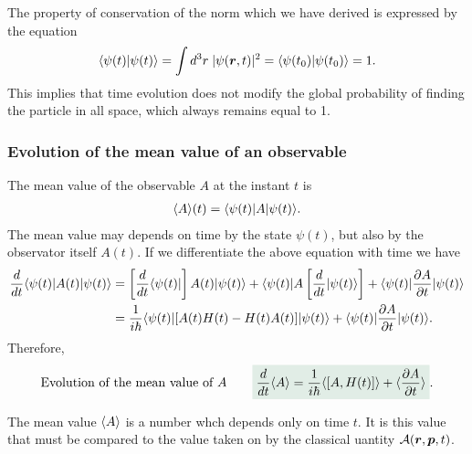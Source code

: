 The property of conservation of the norm which we have derived is expressed by the equation
\begin{align}
    \langle\psi(t)|\psi(t)\rangle=\int d^3r\;|\psi(\bm{r},t)|^2=\langle\psi(t_0)|\psi(t_0)\rangle=1.
\end{align}
This implies that time evolution does not modify the global probability of finding the particle in all space, which always remains equal to 1.

\subsubsection{Evolution of the mean value of an observable}
The mean value of the observable $A$ at the instant $t$ is 
\begin{align}
    \langle A\rangle(t)=\langle\psi(t)|A|\psi(t)\rangle.
\end{align}
The mean value may depends on time by the state $\psi(t)$, but also by the observator itself $A(t)$.
If we differentiate the above equation with time we have 
\begin{align*}
    \frac{d}{dt}\langle\psi(t)|A(t)|\psi(t)\rangle&=\left[\frac{d}{dt}\langle\psi(t)|\right]A(t)|\psi(t)\rangle+\langle\psi(t)|A\left[\frac{d}{dt}|\psi(t)\rangle\right]+
    \langle\psi(t)|\frac{\partial A}{\partial t}|\psi(t)\rangle\\
    &=\frac{1}{i\hbar}\langle\psi(t)|[A(t)H(t)-H(t)A(t)]|\psi(t)\rangle+\langle\psi(t)|\frac{\partial A}{\partial t}|\psi(t)\rangle.
\end{align*}
Therefore,
\begin{align}
    \text{Evolution of the mean value of $A$}\qquad\highlight{\frac{d}{dt}\braket{A}=\frac{1}{i\hbar}\braket{[A,H(t)]}+\braket{\frac{\partial A}{\partial t}}}.
    \label{eq:evolutionmeanvalue}
\end{align}
\begin{emphasizer}
The mean value $\langle A\rangle$ is a number whch depends only on time $t$. It is this value that must be compared to the value taken on by the 
classical uantity $\mathcal{A}(\bm{r},\bm{p},t)$.
\end{emphasizer}


